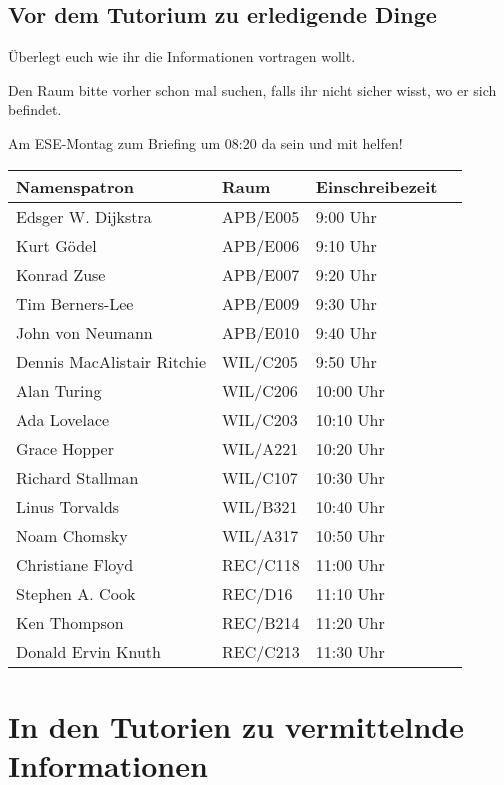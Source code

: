 \documentclass[a4paper,12pt]{report}
\begin{document}
\section{Vor dem Tutorium zu erledigende Dinge}
\begin{itemize*}
\item Überlegt euch wie ihr die Informationen vortragen wollt.
\item Den Raum bitte vorher schon mal suchen, falls ihr nicht sicher wisst, wo er sich befindet.
\item Am ESE-Montag zum Briefing um 08:20 da sein und mit helfen!
\end{itemize*}

\begin{center}
\vspace{1cm}
\begin{tabular}[h]{|l|l|l|l|}
	\hline
	\textbf{Namenspatron}		& \textbf{Raum}	& \textbf{Einschreibezeit}\\ \hline
	Edsger W. Dijkstra			& APB/E005		& 9:00 Uhr\\
	Kurt Gödel					& APB/E006		& 9:10 Uhr\\
	Konrad Zuse					& APB/E007		& 9:20 Uhr\\
	Tim Berners-Lee				& APB/E009		& 9:30 Uhr\\
	John von Neumann			& APB/E010		& 9:40 Uhr\\
	Dennis MacAlistair Ritchie	& WIL/C205		& 9:50 Uhr\\
	Alan Turing 				& WIL/C206		& 10:00 Uhr\\
	Ada Lovelace				& WIL/C203		& 10:10 Uhr\\
	Grace Hopper				& WIL/A221		& 10:20 Uhr\\
	Richard Stallman			& WIL/C107		& 10:30 Uhr\\
	Linus Torvalds				& WIL/B321		& 10:40 Uhr\\
	Noam Chomsky				& WIL/A317		& 10:50 Uhr\\
	Christiane Floyd			& REC/C118		& 11:00 Uhr\\
	Stephen A. Cook				& REC/D16		& 11:10 Uhr\\
	Ken Thompson				& REC/B214		& 11:20 Uhr\\
	Donald Ervin Knuth			& REC/C213		& 11:30 Uhr\\
	\hline
\end{tabular}
\end{center}

\chapter{In den Tutorien zu vermittelnde Informationen}
\end{document}
